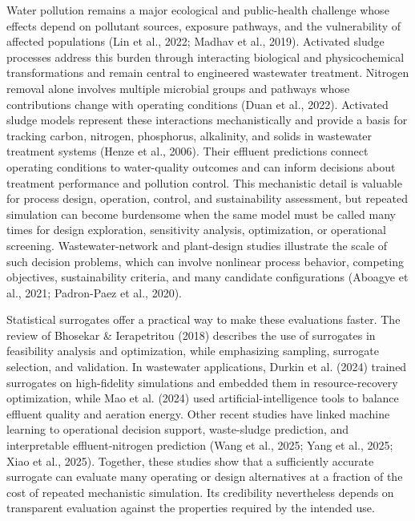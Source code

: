 \documentclass[a4paper,fleqn]{cas-sc}
\begin{document}
Water pollution remains a major ecological and public-health challenge whose effects depend on pollutant sources, exposure pathways, and the vulnerability of affected populations (Lin et al., 2022; Madhav et al., 2019). Activated sludge processes address this burden through interacting biological and physicochemical transformations and remain central to engineered wastewater treatment. Nitrogen removal alone involves multiple microbial groups and pathways whose contributions change with operating conditions (Duan et al., 2022). Activated sludge models represent these interactions mechanistically and provide a basis for tracking carbon, nitrogen, phosphorus, alkalinity, and solids in wastewater treatment systems (Henze et al., 2006). Their effluent predictions connect operating conditions to water-quality outcomes and can inform decisions about treatment performance and pollution control. This mechanistic detail is valuable for process design, operation, control, and sustainability assessment, but repeated simulation can become burdensome when the same model must be called many times for design exploration, sensitivity analysis, optimization, or operational screening. Wastewater-network and plant-design studies illustrate the scale of such decision problems, which can involve nonlinear process behavior, competing objectives, sustainability criteria, and many candidate configurations (Aboagye et al., 2021; Padron-Paez et al., 2020).

Statistical surrogates offer a practical way to make these evaluations faster. The review of Bhosekar \& Ierapetritou (2018) describes the use of surrogates in feasibility analysis and optimization, while emphasizing sampling, surrogate selection, and validation. In wastewater applications, Durkin et al. (2024) trained surrogates on high-fidelity simulations and embedded them in resource-recovery optimization, while Mao et al. (2024) used artificial-intelligence tools to balance effluent quality and aeration energy. Other recent studies have linked machine learning to operational decision support, waste-sludge prediction, and interpretable effluent-nitrogen prediction (Wang et al., 2025; Yang et al., 2025; Xiao et al., 2025). Together, these studies show that a sufficiently accurate surrogate can evaluate many operating or design alternatives at a fraction of the cost of repeated mechanistic simulation. Its credibility nevertheless depends on transparent evaluation against the properties required by the intended use.
\end{document}
